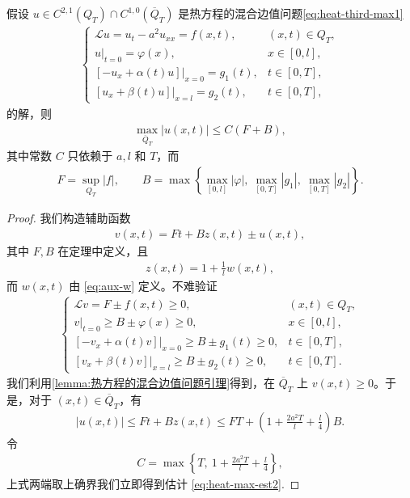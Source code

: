 \documentclass[../../main.tex]{subfiles}%
\begin{document}
\begin{theorem}
假设 $u\in C^{2,1}(Q_T)\cap C^{1,0}(\overline{Q}_T)$ 是热方程的混合边值问题\eqref{eq:heat-third-max1}
\begin{align}
\begin{cases}
\mathcal{L}u=u_t-a^2u_{xx}=f(x,t), & (x,t)\in Q_T,\\
u|_{t=0}=\varphi(x), & x\in[0,l],\\
[-u_x+\alpha(t)u]|_{x=0}=g_1(t), & t\in[0,T],\\
[u_x+\beta(t)u]|_{x=l}=g_2(t), & t\in[0,T],
\end{cases} \label{eq:heat-third-max1}
\end{align}
的解，则
\begin{align}
\max_{\overline{Q}_T}|u(x,t)|\leqslant C(F+B), \label{eq:heat-max-est2}
\end{align}
其中常数 $C$ 只依赖于 $a,l$ 和 $T$，而
\begin{align*}
F=\sup_{Q_T}|f|,\qquad B=\max\left\{\max_{[0,l]}|\varphi|,\ \max_{[0,T]}|g_1|,\ \max_{[0,T]}|g_2|\right\}.
\end{align*}
\end{theorem}
\begin{proof}
我们构造辅助函数
\begin{align*}
v(x,t)=Ft+Bz(x,t)\pm u(x,t),
\end{align*}
其中 $F,B$ 在定理中定义，且
\begin{align*}
z(x,t)=1+\frac{1}{l}w(x,t),
\end{align*}
而 $w(x,t)$ 由 \eqref{eq:aux-w} 定义。不难验证
\begin{align*}
\begin{cases}
\mathcal{L}v=F\pm f(x,t)\geqslant 0, & (x,t)\in Q_T,\\
v|_{t=0}\geqslant B\pm\varphi(x)\geqslant 0, & x\in[0,l],\\
[-v_x+\alpha(t)v]|_{x=0}\geqslant B\pm g_1(t)\geqslant 0, & t\in[0,T],\\
[v_x+\beta(t)v]|_{x=l}\geqslant B\pm g_2(t)\geqslant 0, & t\in[0,T].
\end{cases}
\end{align*}
我们利用\cref{lemma:热方程的混合边值问题引理}得到，在 $\overline{Q}_T$ 上 $v(x,t)\geqslant 0$。于是，对于 $(x,t)\in\overline{Q}_T$，有
\begin{align*}
|u(x,t)|\leqslant Ft+Bz(x,t) 
\leqslant FT+\left(1+\frac{2a^2T}{l}+\frac{l}{4}\right)B.
\end{align*}
令
\begin{align*}
C=\max\left\{T,\ 1+\frac{2a^2T}{l}+\frac{l}{4}\right\},
\end{align*}
上式两端取上确界我们立即得到估计 \eqref{eq:heat-max-est2}.
\end{proof}
\end{document}
